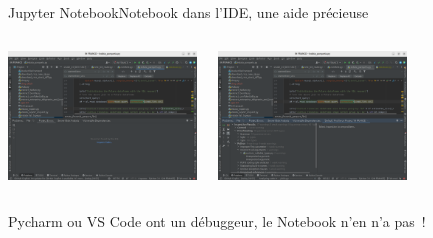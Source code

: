 \documentclass{beamer}
\begin{document}
    \begin{frame}{Jupyter Notebook}{Notebook dans l'IDE, une aide précieuse}
        \begin{columns}
            \begin{center}
                \includegraphics[width=5cm]{image/Pycharm-before-analysis}
            \end{center}
            \begin{center}
                \includegraphics[width=5cm]{image/Pycharm-after-analysis}
            \end{center}
        \end{columns}
        \begin{dangercolorbox}
            Pycharm ou VS Code ont un débuggeur, le Notebook n'en n'a pas~!
        \end{dangercolorbox}
    \end{frame}
\end{document}
